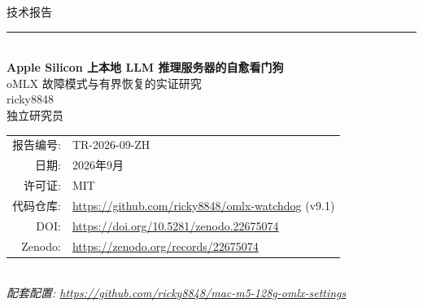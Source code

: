 \documentclass[10pt]{article}
\newcommand{\techreportnumber}{TR-2026-09-ZH}
\begin{document}
\begin{titlepage}
  \centering
  \vspace*{1.2cm}

  {\large\textsc{技术报告}}\\[0.3em]
  \rule{\linewidth}{1pt}\\[0.5em]

  {\Huge\bfseries
    Apple Silicon 上本地 LLM 推理服务器的自愈看门狗}\\[0.6em]

  {\Large oMLX 故障模式与有界恢复的实证研究}\\[1.2em]

  {\large ricky8848}\\[0.3em]
  {\normalsize 独立研究员}\\[2em]

  \begin{tabular}{rl}
    报告编号: & \techreportnumber \\[0.3em]
    日期:     & 2026年9月\\[0.3em]
    许可证:   & MIT \\[0.3em]
    代码仓库: & \url{https://github.com/ricky8848/omlx-watchdog} (v9.1)\\[0.3em]
    DOI:      & \url{https://doi.org/10.5281/zenodo.22675074}\\[0.3em]
    Zenodo:   & \url{https://zenodo.org/records/22675074}
  \end{tabular}\\[2em]

  {\small\itshape
    配套配置: \url{https://github.com/ricky8848/mac-m5-128g-omlx-settings}}

  \vfill
\end{titlepage}

\begin{abstract}
\noindent Apple Silicon 上的本地大语言模型（LLM）推理服务器越来越多地作为自主编码智能体的后端，但它们运行在任何编排器之外：没有 Kubernetes 存活探针、没有 systemd 重启策略——更关键的是，故障模式是\emph{部分性的}（进程存活但引擎卡死）。我们对一台这样的服务器进行了实证研究：\texttt{oMLX} 在 Apple M5 Max（128GB）上服务 Qwen3.8-27B，连续 13 天、共 18{,}516 次看门狗心跳。我们形式化了六种故障类别（引擎卡死、端口占用者、SIGKILL/OOM、陈旧注册表、预填充内存保护拒绝、客户端重试放大），并提出了一个无自干扰的健康模型：四个互补检查的谓词互不冲突，驱动有界升级阶梯（\texttt{omlx restart} $\rightarrow$ 仅监听者端口清理 + 30秒宽限 $\rightarrow$ GUI 重启）。在生产环境中，看门狗在一个 60 秒心跳内检测到所有引擎故障，并在四分钟内恢复服务且无需人工干预；部署后主导的故障类别（模型切换后的陈旧注册表）通过版本化修复被消除。我们讨论了后端自愈与客户端有界重试的正交性，以及投机解码吞吐量（MTP 接受率 85--96\%）与可用性的独立但乘积关系。

\vspace{1em}
\noindent\textbf{关键词：} 本地 LLM 推理、自愈系统、Apple Silicon、看门狗、故障分类学、有界升级
\end{abstract}
\end{document}
